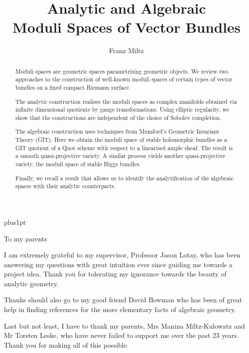 \documentclass[12pt]{ociamthesis}  %
\title{Analytic and Algebraic\\[1ex]Moduli Spaces of Vector Bundles}   %
\author{Franz Miltz}             %
\begin{document}
\baselineskip=18pt plus1pt

\setcounter{secnumdepth}{3}
\setcounter{tocdepth}{3}


\maketitle                  %
\begin{dedication}
  To my parents 
\end{dedication}

\begin{acknowledgements}
  I am extremely grateful to my supervisor, Professor Jason Lotay,
  who has been answering my questions with great intuition ever since
  guiding me towards a project idea. Thank you for tolerating my
  ignorance towards the beauty of analytic geometry.

  Thanks should also go to my good friend David Bowman who has
  been of great help in finding references for the more elementary
  facts of algebraic geometry.

  Last but not least, I have to thank my parents,
  Mrs Manina Miltz-Kulowatz and Mr Torsten Leske, who have never
  failed to support me over the past 23 years. Thank you for
  making all of this possible.
\end{acknowledgements}

\begin{abstract}
  Moduli spaces are geometric spaces parametrising geometric objects.
  We review two approaches to the construction of
  well-known moduli spaces of certain types of vector bundles
  on a fixed compact Riemann surface.

  The analytic construction realises the moduli spaces as complex
  manifolds obtained via infinite dimensional quotients by gauge
  transformations. Using elliptic regularity, we show that the
  constructions are independent of the choice of Sobolev completion.

  The algebraic construction uses techniques from Mumford's Geometric
  Invariant Theory (GIT). Here we obtain the moduli space of
  stable holomorphic bundles as a GIT quotient of a Quot scheme with
  respect to a linearised ample sheaf. The result is a smooth
  quasi-projective variety. A similar process yields another
  quasi-projective variety, the moduli space of stable Higgs bundles.

  Finally, we recall a result that allows us to identify the
  analytification of the algebraic spaces with their analytic
  counterparts.
\end{abstract}
\end{document}
